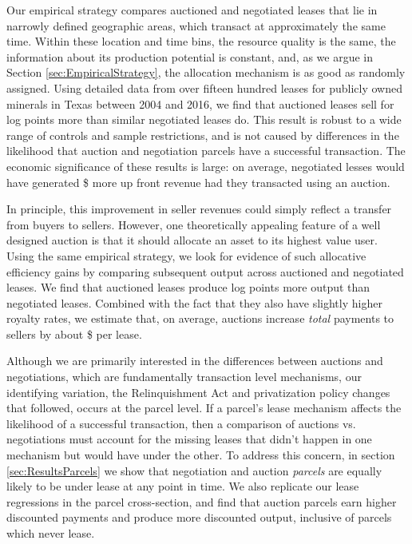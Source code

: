 Our empirical strategy compares auctioned and negotiated leases that lie in narrowly defined geographic areas, which transact at approximately the same time.  Within these location and time bins, the resource quality is the same, the information about its production potential is constant, and, as we argue in Section \ref{sec:EmpiricalStrategy}, the allocation mechanism is as good as randomly assigned.  Using detailed data from over fifteen hundred leases for publicly owned minerals in Texas between 2004 and 2016, we find that auctioned leases sell for  log points more than similar negotiated leases do. This result is robust to a wide range of controls and sample restrictions, and is not caused by differences in the likelihood that auction and negotiation parcels have a successful transaction. The economic significance of these results is large: on average, negotiated lesses would have generated \$ more up front revenue had they transacted using an auction.

In principle, this improvement in seller revenues could simply reflect a transfer from buyers to sellers. However, one theoretically appealing feature of a well designed auction is that it should allocate an asset to its highest value user. Using the same empirical strategy, we look for evidence of such allocative efficiency gains by comparing subsequent output across auctioned and negotiated leases. We find that auctioned leases produce  log points more output than negotiated leases. Combined with the fact that they also have slightly higher royalty rates, we estimate that, on average, auctions increase \textit{total} payments to sellers by about \$ per lease. 

Although we are primarily interested in the differences between auctions and negotiations, which are fundamentally transaction level mechanisms, our identifying variation, the Relinquishment Act and privatization policy changes that followed, occurs at the parcel level.  If a parcel's lease mechanism affects the likelihood of a successful transaction, then a comparison of auctions vs. negotiations must account for the missing leases that didn't happen in one mechanism but would have under the other. To address this concern, in section \ref{sec:ResultsParcels} we show that negotiation and auction \textit{parcels} are equally likely to be under lease at any point in time. We also replicate our lease regressions in the parcel cross-section, and find that auction parcels earn higher discounted payments and produce more discounted output, inclusive of parcels which never lease.


